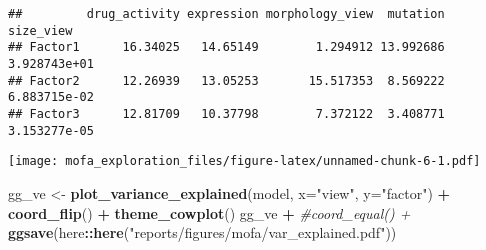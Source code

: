 \documentclass[
]{article}
\newenvironment{Shaded}{\begin{snugshade}}{\end{snugshade}}
\newcommand{\CommentTok}[1]{\textcolor[rgb]{0.56,0.35,0.01}{\textit{#1}}}
\newcommand{\DataTypeTok}[1]{\textcolor[rgb]{0.13,0.29,0.53}{#1}}
\newcommand{\DecValTok}[1]{\textcolor[rgb]{0.00,0.00,0.81}{#1}}
\newcommand{\KeywordTok}[1]{\textcolor[rgb]{0.13,0.29,0.53}{\textbf{#1}}}
\newcommand{\NormalTok}[1]{#1}
\newcommand{\OperatorTok}[1]{\textcolor[rgb]{0.81,0.36,0.00}{\textbf{#1}}}
\newcommand{\StringTok}[1]{\textcolor[rgb]{0.31,0.60,0.02}{#1}}
\begin{document}
\begin{verbatim}
##         drug_activity expression morphology_view  mutation    size_view
## Factor1      16.34025   14.65149        1.294912 13.992686 3.928743e+01
## Factor2      12.26939   13.05253       15.517353  8.569222 6.883715e-02
## Factor3      12.81709   10.37798        7.372122  3.408771 3.153277e-05
\end{verbatim}

\begin{Shaded}
\end{Shaded}

\texttt{[image: mofa\_exploration\_files/figure-latex/unnamed-chunk-6-1.pdf]}

\begin{Shaded}
\begin{Highlighting}[]
\NormalTok{gg_ve <-}\StringTok{ }\KeywordTok{plot_variance_explained}\NormalTok{(model, }\DataTypeTok{x=}\StringTok{"view"}\NormalTok{, }\DataTypeTok{y=}\StringTok{"factor"}\NormalTok{) }\OperatorTok{+}\StringTok{ }\KeywordTok{coord_flip}\NormalTok{() }\OperatorTok{+}
\StringTok{  }\KeywordTok{theme_cowplot}\NormalTok{() }
\NormalTok{gg_ve  }\OperatorTok{+}\StringTok{ }
\StringTok{  }\CommentTok{#coord_equal() +}
\StringTok{  }\KeywordTok{ggsave}\NormalTok{(here}\OperatorTok{::}\KeywordTok{here}\NormalTok{(}\StringTok{"reports/figures/mofa/var_explained.pdf"}\NormalTok{))}
\end{Highlighting}
\end{Shaded}
\end{document}
